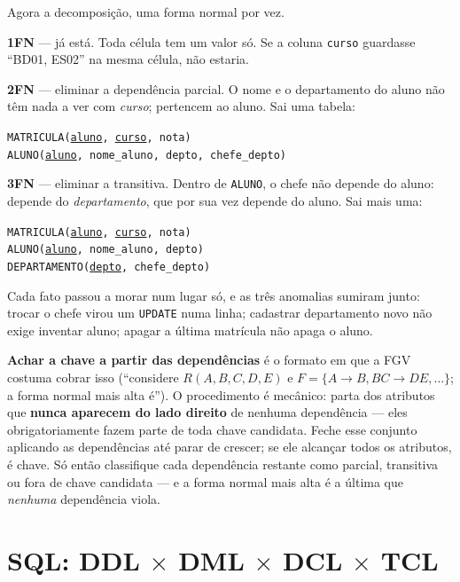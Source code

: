 Agora a decomposição, uma forma normal por vez.

\textbf{1FN} --- já está. Toda célula tem um valor só. Se a coluna
\texttt{curso} guardasse ``BD01, ES02'' na mesma célula, não estaria.

\textbf{2FN} --- eliminar a dependência parcial. O nome e o departamento do
aluno não têm nada a ver com \emph{curso}; pertencem ao aluno. Sai uma tabela:

\begin{center}
\texttt{MATRICULA(\underline{aluno}, \underline{curso}, nota)}\\
\texttt{ALUNO(\underline{aluno}, nome\_aluno, depto, chefe\_depto)}
\end{center}

\textbf{3FN} --- eliminar a transitiva. Dentro de \texttt{ALUNO}, o chefe não
depende do aluno: depende do \emph{departamento}, que por sua vez depende do
aluno. Sai mais uma:

\begin{center}
\texttt{MATRICULA(\underline{aluno}, \underline{curso}, nota)}\\
\texttt{ALUNO(\underline{aluno}, nome\_aluno, depto)}\\
\texttt{DEPARTAMENTO(\underline{depto}, chefe\_depto)}
\end{center}

Cada fato passou a morar num lugar só, e as três anomalias sumiram junto:
trocar o chefe virou um \texttt{UPDATE} numa linha; cadastrar departamento
novo não exige inventar aluno; apagar a última matrícula não apaga o aluno.

\textbf{Achar a chave a partir das dependências} é o formato em que a FGV
costuma cobrar isso (``considere $R(A,B,C,D,E)$ e $F = \{A \to B, BC \to DE,
\ldots\}$; a forma normal mais alta é''). O procedimento é mecânico: parta dos
atributos que \textbf{nunca aparecem do lado direito} de nenhuma dependência
--- eles obrigatoriamente fazem parte de toda chave candidata. Feche esse
conjunto aplicando as dependências até parar de crescer; se ele alcançar todos
os atributos, é chave. Só então classifique cada dependência restante como
parcial, transitiva ou fora de chave candidata --- e a forma normal mais alta
é a última que \emph{nenhuma} dependência viola.

\section{SQL: DDL $\times$ DML $\times$ DCL $\times$ TCL}

